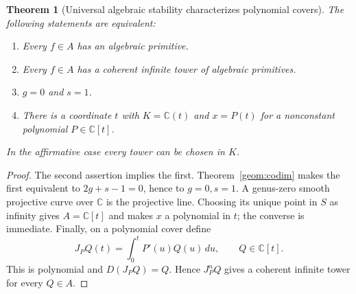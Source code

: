 \documentclass[11pt,a4paper]{article}
\newtheorem{theorem}{Theorem}[section]
\theoremstyle{definition}
\theoremstyle{remark}
\numberwithin{equation}{section}
\begin{document}
\begin{theorem}[Universal algebraic stability characterizes polynomial covers]
\label{geom:polynomial}
The following statements are equivalent:
\begin{enumerate}
\item Every $f\in A$ has an algebraic primitive.
\item Every $f\in A$ has a coherent infinite tower of algebraic primitives.
\item $g=0$ and $s=1$.
\item There is a coordinate $t$ with $K=\mathbb C(t)$ and
      $x=P(t)$ for a nonconstant polynomial $P\in\mathbb C[t]$.
\end{enumerate}
In the affirmative case every tower can be chosen in $K$.
\end{theorem}
\begin{proof}
The second assertion implies the first. Theorem~\ref{geom:codim}
makes the first equivalent to $2g+s-1=0$, hence to $g=0,s=1$.
A genus-zero smooth projective curve over $\mathbb C$ is the projective
line. Choosing its unique point in $S$ as infinity gives
$A=\mathbb C[t]$ and makes $x$ a polynomial in $t$; the converse is
immediate. Finally, on a polynomial cover define
\[
 J_PQ(t)=\int_0^t P'(u)Q(u)\,du,\qquad Q\in\mathbb C[t].
\]
This is polynomial and $D(J_PQ)=Q$. Hence $J_P^nQ$ gives a coherent
infinite tower for every $Q\in A$.
\end{proof}
\end{document}
